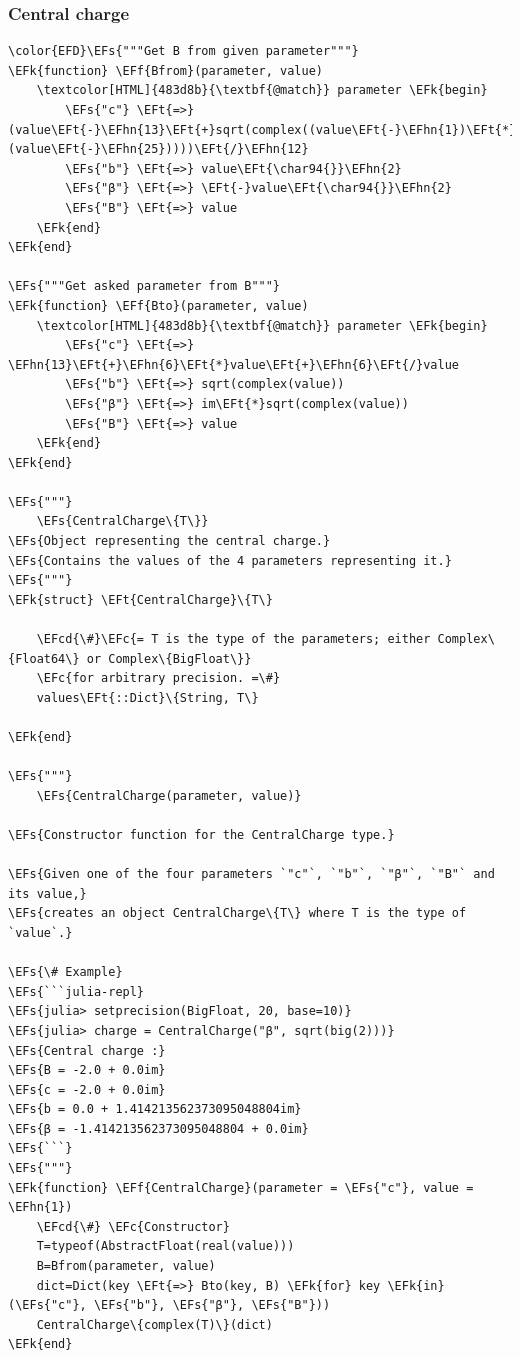 \documentclass[a4paper]{article}
\numberwithin{equation}{section}
\newcommand{\EFc}[1]{\textcolor{EFc}{#1}} %
\newcommand{\EFcd}[1]{\textcolor{EFcd}{#1}} %
\newcommand{\EFs}[1]{\textcolor{EFs}{#1}} %
\newcommand{\EFk}[1]{\textcolor{EFk}{#1}} %
\newcommand{\EFf}[1]{\textcolor{EFf}{#1}} %
\newcommand{\EFt}[1]{\textcolor{EFt}{#1}} %
\newcommand{\EFhn}[1]{\textcolor{EFhn}{#1}} %
\begin{document}
\subsubsection*{Central charge}
\label{sec:org656306b}

\begin{Code}
\begin{Verbatim}
\color{EFD}\EFs{"""Get B from given parameter"""}
\EFk{function} \EFf{Bfrom}(parameter, value)
    \textcolor[HTML]{483d8b}{\textbf{@match}} parameter \EFk{begin}
        \EFs{"c"} \EFt{=>} (value\EFt{-}\EFhn{13}\EFt{+}sqrt(complex((value\EFt{-}\EFhn{1})\EFt{*}(value\EFt{-}\EFhn{25}))))\EFt{/}\EFhn{12}
        \EFs{"b"} \EFt{=>} value\EFt{\char94{}}\EFhn{2}
        \EFs{"β"} \EFt{=>} \EFt{-}value\EFt{\char94{}}\EFhn{2}
        \EFs{"B"} \EFt{=>} value
    \EFk{end}
\EFk{end}

\EFs{"""Get asked parameter from B"""}
\EFk{function} \EFf{Bto}(parameter, value)
    \textcolor[HTML]{483d8b}{\textbf{@match}} parameter \EFk{begin}
        \EFs{"c"} \EFt{=>} \EFhn{13}\EFt{+}\EFhn{6}\EFt{*}value\EFt{+}\EFhn{6}\EFt{/}value
        \EFs{"b"} \EFt{=>} sqrt(complex(value))
        \EFs{"β"} \EFt{=>} im\EFt{*}sqrt(complex(value))
        \EFs{"B"} \EFt{=>} value
    \EFk{end}
\EFk{end}

\EFs{"""}
    \EFs{CentralCharge\{T\}}
\EFs{Object representing the central charge.}
\EFs{Contains the values of the 4 parameters representing it.}
\EFs{"""}
\EFk{struct} \EFt{CentralCharge}\{T\}

    \EFcd{\#}\EFc{= T is the type of the parameters; either Complex\{Float64\} or Complex\{BigFloat\}}
    \EFc{for arbitrary precision. =\#}
    values\EFt{::Dict}\{String, T\}

\EFk{end}

\EFs{"""}
    \EFs{CentralCharge(parameter, value)}

\EFs{Constructor function for the CentralCharge type.}

\EFs{Given one of the four parameters `"c"`, `"b"`, `"β"`, `"B"` and its value,}
\EFs{creates an object CentralCharge\{T\} where T is the type of `value`.}

\EFs{\# Example}
\EFs{```julia-repl}
\EFs{julia> setprecision(BigFloat, 20, base=10)}
\EFs{julia> charge = CentralCharge("β", sqrt(big(2)))}
\EFs{Central charge :}
\EFs{B = -2.0 + 0.0im}
\EFs{c = -2.0 + 0.0im}
\EFs{b = 0.0 + 1.414213562373095048804im}
\EFs{β = -1.414213562373095048804 + 0.0im}
\EFs{```}
\EFs{"""}
\EFk{function} \EFf{CentralCharge}(parameter = \EFs{"c"}, value = \EFhn{1})
    \EFcd{\#} \EFc{Constructor}
    T=typeof(AbstractFloat(real(value)))
    B=Bfrom(parameter, value)
    dict=Dict(key \EFt{=>} Bto(key, B) \EFk{for} key \EFk{in} (\EFs{"c"}, \EFs{"b"}, \EFs{"β"}, \EFs{"B"}))
    CentralCharge\{complex(T)\}(dict)
\EFk{end}
\end{Verbatim}
\end{Code}
\end{document}
